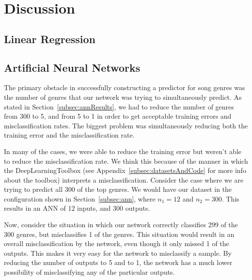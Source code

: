 \documentclass[12pt]{article}
\begin{document}


\section{Discussion}
\label{sec:discussion}

\subsection{Linear Regression}
\label{subsec:linearRegressionDisc}

\subsection{Artificial Neural Networks}
\label{subsec:annDisc}
The primary obstacle in successfully constructing a predictor for song genres was the number of genres that our network was trying to simultaneously predict. As stated in Section~\ref{subsec:annResults}, we had to reduce the number of genres from 300 to 5, and from 5 to 1 in order to get acceptable training errors and misclassification rates. The biggest problem was simultaneously reducing both the training error and the misclassification rate. 

In many of the cases, we were able to reduce the training error but weren't able to reduce the misclassification rate. We think this because of the manner in which the DeepLearningToolbox (see Appendix~\ref{subsec:datasetsAndCode} for more info about the toolbox) interprets a misclassification. Consider the case where we are trying to predict all 300 of the top genres. We would have our dataset in the configuration shown in Section~\ref{subsec:ann}, where $n_1 = 12$ and $n_2 = 300$. This results in an ANN of 12 inputs, and 300 outputs. 

Now, consider the situation in which our network correctly classifies 299 of the 300 genres, but misclassifies 1 of the genres. This situation would result in an overall misclassification by the network, even though it only missed 1 of the outputs. This makes it very easy for the network to misclassify a sample. By reducing the number of outputs to 5 and to 1, the network has a much lower possibility of misclassifying any of the particular outputs. 
\end{document}
